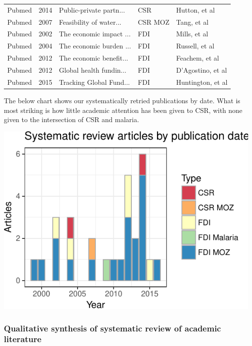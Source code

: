 \documentclass[]{elsarticle} %
\begin{document}
\begin{longtable}{lllll}
  Pubmed & 2014 & Public-private partn... & CSR & Hutton, et al \\ 
  Pubmed & 2007 & Feasibility of water... & CSR MOZ & Tang, et al \\ 
  Pubmed & 2002 & The economic impact ... & FDI & Mills, et al \\ 
  Pubmed & 2004 & The economic burden ... & FDI & Russell, et al \\ 
  Pubmed & 2012 & The economic benefit... & FDI & Feachem, et al \\ 
  Pubmed & 2012 & Global health fundin... & FDI & D'Agostino, et al \\ 
  Pubmed & 2015 & Tracking Global Fund... & FDI & Huntington, et al \\ 
   \hline
\hline
\end{longtable}

\endgroup

The below chart shows our systematically retried publications by date.
What is most striking is how little academic attention has been given to
CSR, with none given to the intersection of CSR and malaria.

\begin{center}\includegraphics{paper_files/figure-latex/unnamed-chunk-15-1} \end{center}

\subsubsection{Qualitative synthesis of systematic review of academic
literature}\label{qualitative-synthesis-of-systematic-review-of-academic-literature}
\end{document}
